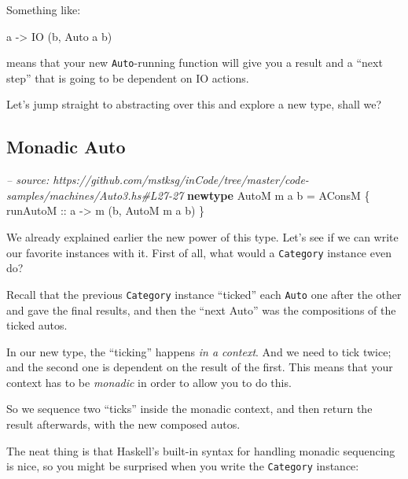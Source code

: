 \documentclass[]{article}
\newenvironment{Shaded}{}{}
\newcommand{\KeywordTok}[1]{\textcolor[rgb]{0.00,0.44,0.13}{\textbf{{#1}}}}
\newcommand{\DataTypeTok}[1]{\textcolor[rgb]{0.56,0.13,0.00}{{#1}}}
\newcommand{\CommentTok}[1]{\textcolor[rgb]{0.38,0.63,0.69}{\textit{{#1}}}}
\newcommand{\OtherTok}[1]{\textcolor[rgb]{0.00,0.44,0.13}{{#1}}}
\newcommand{\FunctionTok}[1]{\textcolor[rgb]{0.02,0.16,0.49}{{#1}}}
\newcommand{\NormalTok}[1]{{#1}}
\begin{document}
Something like:

\begin{Shaded}
\begin{Highlighting}[]
\NormalTok{a }\OtherTok{->} \DataTypeTok{IO} \NormalTok{(b, }\DataTypeTok{Auto} \NormalTok{a b)}
\end{Highlighting}
\end{Shaded}

means that your new \texttt{Auto}-running function will give you a
result and a ``next step'' that is going to be dependent on IO actions.

Let's jump straight to abstracting over this and explore a new type,
shall we?

\subsection{Monadic Auto}\label{monadic-auto}

\begin{Shaded}
\begin{Highlighting}[]
\CommentTok{-- source: https://github.com/mstksg/inCode/tree/master/code-samples/machines/Auto3.hs#L27-27}
\KeywordTok{newtype} \DataTypeTok{AutoM} \NormalTok{m a b }\FunctionTok{=} \DataTypeTok{AConsM} \NormalTok{\{}\OtherTok{ runAutoM ::} \NormalTok{a }\OtherTok{->} \NormalTok{m (b, }\DataTypeTok{AutoM} \NormalTok{m a b) \}}
\end{Highlighting}
\end{Shaded}

We already explained earlier the new power of this type. Let's see if we
can write our favorite instances with it. First of all, what would a
\texttt{Category} instance even do?

Recall that the previous \texttt{Category} instance ``ticked'' each
\texttt{Auto} one after the other and gave the final results, and then
the ``next Auto'' was the compositions of the ticked autos.

In our new type, the ``ticking'' happens \emph{in a context}. And we
need to tick twice; and the second one is dependent on the result of the
first. This means that your context has to be \emph{monadic} in order to
allow you to do this.

So we sequence two ``ticks'' inside the monadic context, and then return
the result afterwards, with the new composed autos.

The neat thing is that Haskell's built-in syntax for handling monadic
sequencing is nice, so you might be surprised when you write the
\texttt{Category} instance:
\end{document}
